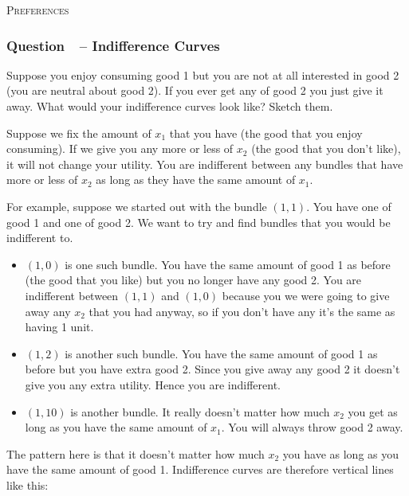 \documentclass[12pt]{article}
\newcommand{\topic}[1]{\begin{center}\large\textsc{#1}\normalsize\end{center}}
\newcounter{question}[section]
\newcommand{\question}[1]{\refstepcounter{question}
  \subsubsection*{Question~\thequestion~-- #1}}
\begin{document}
\newpage
\topic{Preferences}
\question{Indifference Curves}
Suppose you enjoy consuming good 1 but you are not at all interested in good 2 (you are neutral about good 2). If you ever get any of good 2 you just give it away.  What would your indifference curves look like? Sketch them.

\textcolor{solution-color}{
  Suppose we fix the amount of $x_1$ that you have (the good that you enjoy consuming). If we give you any more or less of $x_2$ (the good that you don't like), it will not change your utility. You are indifferent between any bundles that have more or less of $x_2$ as long as they have the same amount of $x_1$.
}

\textcolor{solution-color}{
  For example, suppose we started out with the bundle $\left( 1,1 \right)$. You
  have one of good 1 and one of good 2. We want to try and find bundles that
  you would be indifferent to.
  \begin{itemize}
    \item $\left( 1,0 \right)$ is one such bundle. You have the same amount of good 1 as before (the good that you like) but you no longer have any good 2. You are indifferent between $\left( 1,1 \right)$ and $\left( 1,0 \right)$ because you we were going to give away any $x_2$ that you had anyway, so if you don't have any it's the same as having 1 unit.
    \item $\left( 1,2 \right)$ is another such bundle. You have the same amount
      of good 1 as before but you have extra good 2. Since you give away any good 2
      it doesn't give you any extra utility. Hence you are
      indifferent.
    \item $\left( 1,10 \right)$ is another bundle. It really doesn't matter how
      much $x_2$ you get as long as you have the same amount of $x_1$. You will
      always throw good 2 away.
  \end{itemize}
  The pattern here is that it doesn't matter how much $x_2$ you have as long as
  you have the same amount of good 1. Indifference curves are therefore vertical
  lines like this:
}
\textcolor{solution-color}{
  \begin{center}
  \end{center}
}
\end{document}
